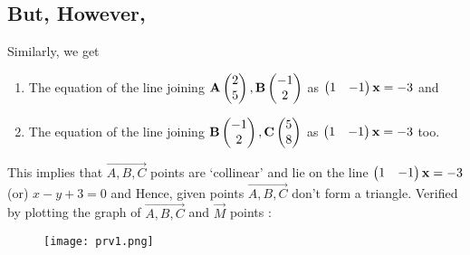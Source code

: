 \documentclass[journal,12pt,twocolumn]{IEEEtran}
\begin{document}
\subsection*{\large But, However,} Similarly, we get
\newline
\begin{enumerate}
    \item The equation of the line joining $\mathbf{A}\begin{pmatrix}2\\5\end{pmatrix}, \mathbf{B}\begin{pmatrix}-1\\2\end{pmatrix}$ as $\begin{pmatrix}1 & - 1\end{pmatrix}\mathbf{x} = -3$ and 
    \newline
    \item The equation of the line joining $\mathbf{B}\begin{pmatrix}-1\\2\end{pmatrix}, \mathbf{C}\begin{pmatrix}5\\8\end{pmatrix}$ as $\begin{pmatrix}1 & - 1\end{pmatrix}\mathbf{x}=-3$ too.\newline
\end{enumerate}
 This implies that $\vec{A,B,C}$ points are `collinear' and lie on the line $\begin{pmatrix}1 & - 1\end{pmatrix}\mathbf{x} = -3$ (or) $x-y+3=0$ and Hence, given points $\vec{A,B,C}$ don't form a triangle.
\newline
\large Verified by plotting the graph of $\vec{A,B,C}$ and $\vec{M}$ points :
\begin{figure}[ht!]
\centering
\texttt{[image: prv1.png]}
\end{figure}
 
\end{document}

